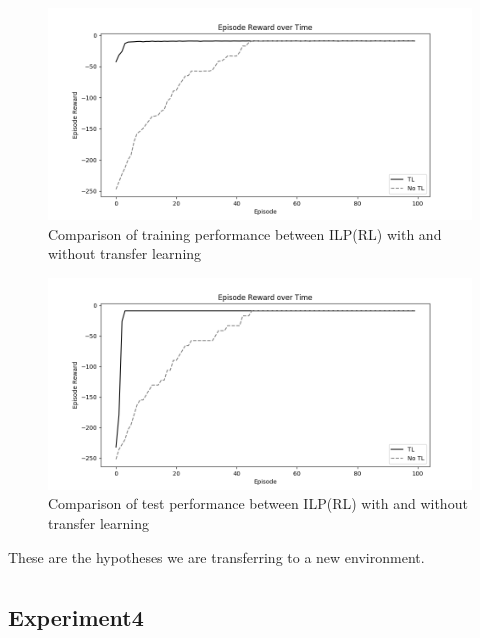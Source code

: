 \begin{figure}[!htb]
\centering
\includegraphics[width=1.0\textwidth]{./figures/experiment4_after_training}
\caption{Comparison of training performance between ILP(RL) with and without transfer learning}
\label{experiment3_training}
\end{figure}

\begin{figure}[!htb]
\centering
\includegraphics[width=1.0\textwidth]{./figures/experiment4_after_test}
\caption{Comparison of test performance between ILP(RL) with and without transfer learning}
\label{experiment3_test}
\end{figure}

These are the hypotheses we are transferring to a new environment.
\begin{equation*}
\begin{split}
\end{split}
\end{equation*}

\newpage
\subsection{Experiment4}

